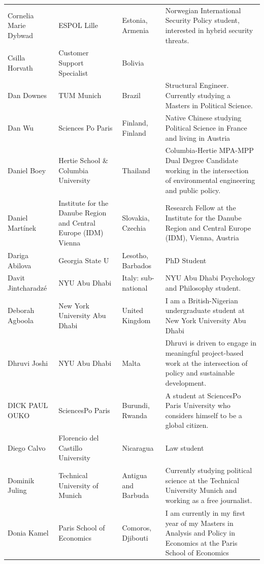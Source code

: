 \documentclass[]{article}
\begin{document}
\begin{longtable}{l>{\raggedright\arraybackslash}p{2cm}>{\raggedright\arraybackslash}p{2cm}>{\raggedright\arraybackslash}p{3cm}}
Cornelia Marie Dybwad & ESPOL Lille & Estonia, Armenia & Norwegian International Security Policy student, interested in hybrid security threats.\\
\addlinespace
\rowcolor{gray!6}  Csilla Horvath & Customer Support Specialist & Bolivia & \\
Dan Downes & TUM Munich & Brazil & Structural Engineer. Currently studying a Masters in Political Science.\\
\rowcolor{gray!6}  Dan Wu & Sciences Po Paris & Finland, Finland & Native Chinese studying Political Science in France and living in Austria\\
Daniel Boey & Hertie School \& Columbia University & Thailand & Columbia-Hertie MPA-MPP Dual Degree Candidate working in the intersection of environmental engineering and public policy.\\
\rowcolor{gray!6}  Daniel Martínek & Institute for the Danube Region and Central Europe (IDM) Vienna & Slovakia, Czechia & Research Fellow at the Institute for the Danube Region and Central Europe (IDM), Vienna, Austria\\
\addlinespace
Dariga Abilova & Georgia State U & Lesotho, Barbados & PhD Student\\
\rowcolor{gray!6}  Davit Jintcharadzé & NYU Abu Dhabi & Italy: sub-national & NYU Abu Dhabi Psychology and Philosophy student.\\
Deborah Agboola & New York University Abu Dhabi & United Kingdom & I am a British-Nigerian undergraduate student at New York University Abu Dhabi\\
\rowcolor{gray!6}  Dhruvi Joshi & NYU Abu Dhabi & Malta & Dhruvi is driven to engage in meaningful project-based work at the intersection of policy and sustainable development.\\
DICK PAUL OUKO & SciencesPo Paris & Burundi, Rwanda & A student at SciencesPo Paris University who considers himself to be a global citizen.\\
\addlinespace
\rowcolor{gray!6}  Diego Calvo & Florencio del Castillo University & Nicaragua & Law student\\
Dominik Juling & Technical University of Munich & Antigua and Barbuda & Currently studying political science at the Technical University Munich and working as a free journalist.\\
\rowcolor{gray!6}  Donia Kamel & Paris School of Economics & Comoros, Djibouti & I am currently in my first year of my Masters in Analysis and Policy in Economics at the Paris School of Economics\\

\end{longtable}
\end{document}
